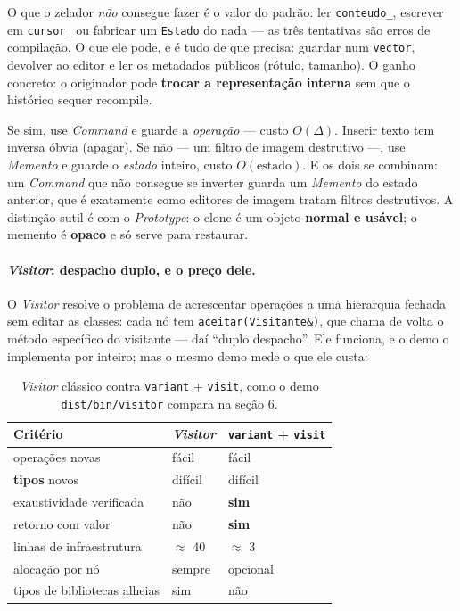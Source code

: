 O que o zelador \emph{não} consegue fazer é o valor do padrão: ler
\texttt{conteudo\_}, escrever em \texttt{cursor\_} ou fabricar um
\texttt{Estado} do nada --- as três tentativas são erros de compilação. O que
ele pode, e é tudo de que precisa: guardar num \texttt{vector}, devolver ao
editor e ler os metadados públicos (rótulo, tamanho). O ganho concreto: o
originador pode \textbf{trocar a representação interna} sem que o histórico
sequer recompile.

\begin{regra}
Se sim, use \emph{Command} e guarde a \emph{operação} --- custo $O(\Delta)$.
Inserir texto tem inversa óbvia (apagar). Se não --- um filtro de imagem
destrutivo ---, use \emph{Memento} e guarde o \emph{estado} inteiro, custo
$O(\text{estado})$. E os dois se combinam: um \emph{Command} que não consegue se
inverter guarda um \emph{Memento} do estado anterior, que é exatamente como
editores de imagem tratam filtros destrutivos. A distinção sutil é com o
\emph{Prototype}: o clone é um objeto \textbf{normal e usável}; o memento é
\textbf{opaco} e só serve para restaurar.
\end{regra}

\paragraph{\emph{Visitor}: despacho duplo, e o preço dele.} O \emph{Visitor}
resolve o problema de acrescentar operações a uma hierarquia fechada sem editar
as classes: cada nó tem \texttt{aceitar(Visitante\&)}, que chama de volta o
método específico do visitante --- daí ``duplo despacho''. Ele funciona, e o
demo o implementa por inteiro; mas o mesmo demo mede o que ele custa:

\begin{table}[htbp]
\centering
\caption{\emph{Visitor} clássico contra \texttt{variant} + \texttt{visit}, como
         o demo \texttt{dist/bin/visitor} compara na seção 6.}
\label{tab:visitor-variant}
\footnotesize
\begin{tabular}{@{}lll@{}}
\toprule
\textbf{Critério} & \textbf{\emph{Visitor}} & \textbf{\texttt{variant} + \texttt{visit}} \\
\midrule
operações novas               & fácil    & fácil \\
\textbf{tipos} novos          & difícil  & difícil \\
exaustividade verificada      & não      & \textbf{sim} \\
retorno com valor             & não      & \textbf{sim} \\
linhas de infraestrutura      & $\approx$ 40 & $\approx$ 3 \\
alocação por nó               & sempre   & opcional \\
tipos de bibliotecas alheias  & sim      & não \\
\bottomrule
\end{tabular}
\end{table}

